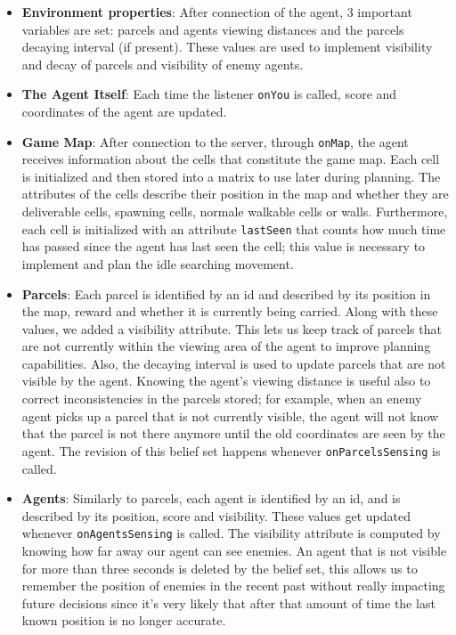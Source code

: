 \documentclass[a4paper, 11pt]{article}
\begin{document}
\begin{itemize}
\item \textbf{Environment properties}: After connection of the agent, 3 important variables are set: parcels and agents viewing distances and the parcels decaying interval (if present). These values are used to implement visibility and decay of parcels and visibility of enemy agents.
\item \textbf{The Agent Itself}: Each time the listener \verb|onYou| is called, score and coordinates of the agent are updated.
\item \textbf{Game Map}: After connection to the server, through \verb|onMap|, the agent receives  information about the cells that constitute the game map. Each cell is initialized and then stored into a matrix to use later during planning. The attributes of the cells describe their position in the map and whether they are deliverable cells, spawning cells, normale walkable cells or walls. Furthermore, each cell is initialized with an attribute \verb|lastSeen| that counts how much time has passed since the agent has last seen the cell; this value is necessary to implement and plan the idle searching movement.
\item \textbf{Parcels}: Each parcel is identified by an id and described by its position in the map, reward and whether it is currently being carried. Along with these values, we added a visibility attribute. This lets us keep track of parcels that are not currently within the viewing area of the agent to improve planning capabilities. Also, the decaying interval is used to update parcels that are not visible by the agent. Knowing the agent's viewing distance is useful also to correct inconsistencies in the parcels stored; for example, when an enemy agent picks up a parcel that is not currently visible, the agent will not know that the parcel is not there anymore until the old coordinates are seen by the agent. The revision of this belief set happens whenever \verb|onParcelsSensing| is called.
\item \textbf{Agents}: Similarly to parcels, each agent is identified by an id, and is described by its position, score and visibility. These values get updated whenever \verb|onAgentsSensing| is called. The visibility attribute is computed by knowing how far away our agent can see enemies. An agent that is not visible for more than three seconds is deleted by the belief set, this allows us to remember the position of enemies in the recent past without really impacting future decisions since it's very likely that after that amount of time the last known position is no longer accurate.
\end{itemize}
\end{document}
